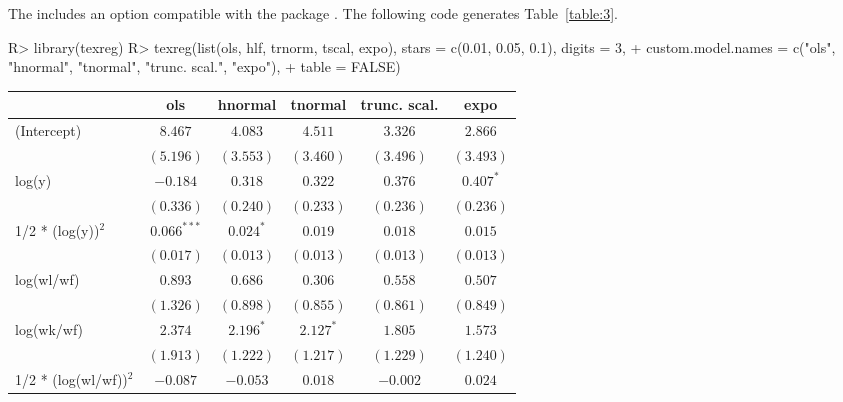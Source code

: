 \documentclass[nojss]{jss}
\begin{document}
The  includes an  option compatible with the 
 package \citep{texreg13}. The following code generates Table~\ref{table:3}.

\begin{Schunk}
\begin{Sinput}
R> library(texreg)
R> texreg(list(ols, hlf, trnorm, tscal, expo), stars = c(0.01, 0.05, 0.1), digits = 3, 
+    custom.model.names = c("ols", "hnormal", "tnormal", "trunc. scal.", "expo"), 
+    table = FALSE)
\end{Sinput}
\end{Schunk}

\begin{table}
\centering
\begin{adjustbox}{width=1\textwidth}
\small
\begin{tabular}{l c c c c c}
\hline
 & ols & hnormal & tnormal & trunc. scal. & expo \\
\hline
(Intercept)             & $8.467$       & $4.083$        & $4.511$        & $3.326$        & $2.866$        \\
                        & $(5.196)$     & $(3.553)$      & $(3.460)$      & $(3.496)$      & $(3.493)$      \\
log(y)                  & $-0.184$      & $0.318$        & $0.322$        & $0.376$        & $0.407^{*}$    \\
                        & $(0.336)$     & $(0.240)$      & $(0.233)$      & $(0.236)$      & $(0.236)$      \\
1/2 * (log(y))$^2$      & $0.066^{***}$ & $0.024^{*}$    & $0.019$        & $0.018$        & $0.015$        \\
                        & $(0.017)$     & $(0.013)$      & $(0.013)$      & $(0.013)$      & $(0.013)$      \\
log(wl/wf)              & $0.893$       & $0.686$        & $0.306$        & $0.558$        & $0.507$        \\
                        & $(1.326)$     & $(0.898)$      & $(0.855)$      & $(0.861)$      & $(0.849)$      \\
log(wk/wf)              & $2.374$       & $2.196^{*}$    & $2.127^{*}$    & $1.805$        & $1.573$        \\
                        & $(1.913)$     & $(1.222)$      & $(1.217)$      & $(1.229)$      & $(1.240)$      \\
1/2 * (log(wl/wf))$^2$  & $-0.087$      & $-0.053$       & $0.018$        & $-0.002$       & $0.024$        \\

\end{tabular}
\end{adjustbox}
\end{table}
\end{document}
